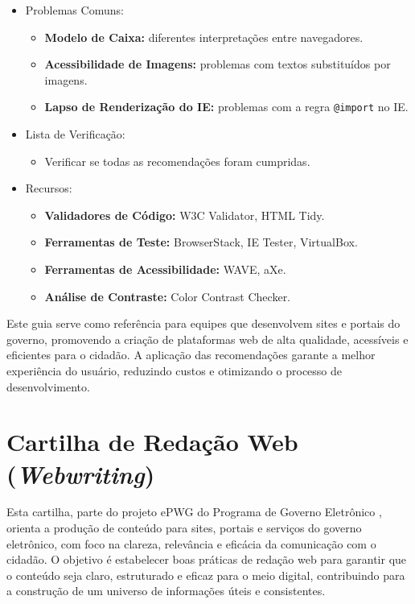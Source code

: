 \documentclass[
  12pt,
  openright,
  twoside,
  a4paper,
  english,
  french,
  spanish,
  brazil
]{abntex2}
\begin{document}
\begin{itemize}
\begin{itemize}
  \end{itemize}
  \item Problemas Comuns:
  \begin{itemize}
    \item \textbf{Modelo de Caixa:} diferentes interpretações entre navegadores.
    \item \textbf{Acessibilidade de Imagens:} problemas com textos substituídos por imagens.
    \item \textbf{Lapso de Renderização do IE:} problemas com a regra \texttt{@import} no IE.
  \end{itemize}
  \item Lista de Verificação:
  \begin{itemize}
    \item Verificar se todas as recomendações foram cumpridas.
  \end{itemize}
  \item Recursos:
  \begin{itemize}
    \item \textbf{Validadores de Código:} W3C Validator, HTML Tidy.
    \item \textbf{Ferramentas de Teste:} BrowserStack, IE Tester, VirtualBox.
    \item \textbf{Ferramentas de Acessibilidade:} WAVE, aXe.
    \item \textbf{Análise de Contraste:} Color Contrast Checker.
  \end{itemize}
\end{itemize}

Este guia serve como referência para equipes que desenvolvem sites e portais do
governo, promovendo a criação de plataformas web de alta qualidade, acessíveis e
eficientes para o cidadão. A aplicação das recomendações garante a melhor
experiência do usuário, reduzindo custos e otimizando o processo de
desenvolvimento.

\section{Cartilha de Redação Web (\textit{Webwriting})}

Esta cartilha, parte do projeto ePWG do Programa de Governo Eletrônico
\cite{ePWG}, orienta a produção de conteúdo para sites, portais e serviços do
governo eletrônico, com foco na clareza, relevância e eficácia da comunicação
com o cidadão. O objetivo é estabelecer boas práticas de redação web para
garantir que o conteúdo seja claro, estruturado e eficaz para o meio digital,
contribuindo para a construção de um universo de informações úteis e
consistentes.
\end{document}
